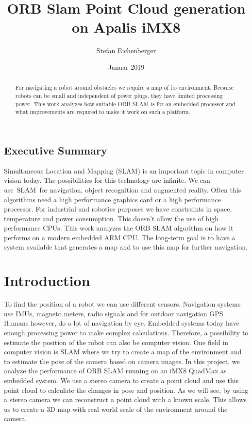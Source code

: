 \documentclass[11pt,a4paper,titlepage,oneside]{report}
\title{ORB Slam Point Cloud generation on Apalis iMX8}
\author{Stefan Eichenberger}
\date{Januar 2019}
\begin{document}
\maketitle

\begin{abstract}
	For navigating a robot around obstacles we require a map of its environment. Because robots can be small and independent of power plugs, they have limited processing power. This work analyzes how suitable ORB SLAM is for an embedded processor and what improvements are required to make it work on such a platform.
\end{abstract}

\section*{Executive Summary}
Simultaneous Location and Mapping (SLAM) is an important topic in computer vision today. The possibilities for this technology are infinite. We can use SLAM for navigation, object recognition and augmented reality. Often this algorithms need a high performance graphics card or a high performance processor. For industrial and robotics purposes we have constraints in space, temperature and power consumption. This doesn’t allow the use of high performance CPUs. This work analyzes the ORB SLAM algorithm on how it performs on a modern embedded ARM CPU. The long-term goal is to have a system available that generates a map and to use this map for further navigation.

\tableofcontents

\chapter{Introduction}
To find the position of a robot we can use different sensors. Navigation systems use IMUs, magneto meters, radio signals and for outdoor navigation GPS. Humans however, do a lot of navigation by eye. Embedded systems today have enough processing power to make complex calculations. Therefore, a possibility to estimate the position of the robot can also be computer vision. One field in computer vision is SLAM where we try to create a map of the environment and to estimate the pose of the camera based on camera images. In this project, we analyze the performance of ORB SLAM \cite{orbslam} running on an iMX8 QuadMax as embedded system. We use a stereo camera to create a point cloud and use this point cloud to calculate the changes in pose and position. As we will see, by using a stereo camera we can reconstruct a point cloud with a known scale. This allows us to create a 3D map with real world scale of the environment around the camera.
\end{document}
